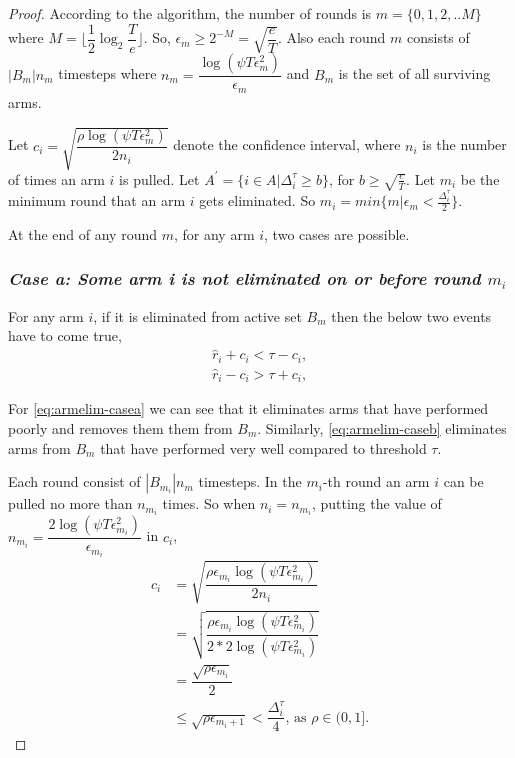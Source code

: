 \begin{proof}

According to the algorithm, the number of rounds is $m=\lbrace 0,1,2,.. M\rbrace $ where $M=\big\lfloor \dfrac{1}{2}\log_{2} \dfrac{T}{e}\big\rfloor$. So, $\epsilon_{m}\geq 2^{-M} = \sqrt{\dfrac{e}{T}}$. Also each round $m$ consists of $|B_{m}|n_{m}$ timesteps where $n_{m} = \dfrac{\log(\psi T \epsilon_{m}^{2})}{\epsilon_{m}}$ and $B_{m}$ is the set of all surviving arms. 

Let $c_{i} = \sqrt{\dfrac{\rho\log{(\psi T\epsilon_{m}^{2})}}{2 n_{i}}}$ denote the confidence interval, where $n_{i}$ is the number of times an arm $i$ is pulled. Let $A^{'}=\lbrace i\in A|\Delta_{i}^{\tau}\geq b\rbrace$, for $b\geq \sqrt{\frac{e}{T}}$. Let $m_{i}$ be the minimum round that an arm $i$ gets eliminated. So $m_{i}=min\lbrace m| \epsilon_{m}<\frac{\Delta_{i}^{\tau}}{2}\rbrace$. 

At the end of any round $m$, for any arm $i$, two cases are possible.

\subsubsection{\textit{Case a: Some arm i is not eliminated on or before round $m_{i}$}}
For any arm $i$, if it is eliminated from active set $B_{m}$ then the below two events have to come true,
\begin{align}
\hat{r}_{i} + c_{i} < \tau - c_{i}, \label{eq:armelim-casea}\\
\hat{r}_{i} - c_{i} > \tau + c_{i}, \label{eq:armelim-caseb}
\end{align}

For \ref{eq:armelim-casea} we can see that it eliminates arms that have performed poorly and removes them them from $B_{m}$. Similarly, \ref{eq:armelim-caseb} eliminates arms from $B_{m}$ that have performed very well compared to threshold $\tau$.

Each round consist of $|B_{m_{i}}|n_{m}$ timesteps. In the $m_{i}$-th round an arm $i$ can be pulled no more than $n_{m_{i}}$ times. So when $n_{i}=n_{m_{i}}$, putting the value of $n_{m_{i}}=\dfrac{2\log{(\psi T\epsilon_{m_{i}}^{2})}}{\epsilon_{m_{i}}}$ in $c_{i}$, 
\begin{align*}
c_{i}&=\sqrt{\dfrac{\rho\epsilon_{m_{i}}\log (\psi T\epsilon_{m_{i}}^{2})}{2 n_{i}}}\\
&=\sqrt{\dfrac{\rho\epsilon_{m_{i}}\log (\psi T\epsilon_{m_{i}}^{2})}{2*2 \log(\psi T\epsilon_{m_{i}}^{2})}}\\
& =\dfrac{\sqrt{\rho\epsilon_{m_{i}}}}{2}\\
& \leq \sqrt{\rho\epsilon_{m_{i}+1}} < \dfrac{\Delta_{i}^{\tau}}{4} \text{, as }\rho\in (0,1].
\end{align*}


\end{proof}
